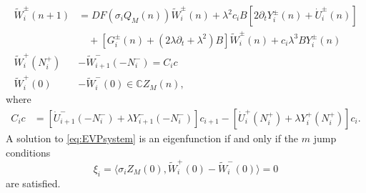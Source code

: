 \documentclass[12pt,reqno]{amsart}
\def\C{{\mathbb C}}
\theoremstyle{definition}
\begin{document}
\begin{equation}\label{eq:EVPsystem}
\begin{aligned}
\tilde{W}_i^\pm(n+1) &= DF(\sigma_i Q_M(n)) \tilde{W}_i^\pm(n) + \lambda^2 c_i B[ 2 \partial_t Y_i^\pm(n) + \dot{U}_i^\pm(n)] \\
&\quad+ [G_i^\pm(n) + (2 \lambda \partial_t + \lambda^2) B] \tilde{W}_i^\pm(n) + c_i \lambda^3 B Y_i^\pm(n) \\
\tilde{W}_i^+(N_i^+) &- \tilde{W}_{i+1}^-(-N_i^-) = C_i c \\
\tilde{W}_i^+(0) &- \tilde{W}_i^-(0) \in \C Z_M(n),
\end{aligned}
\end{equation}
where
\begin{equation}
\begin{aligned}
C_i c &= [ \dot{U}_{i+1}^-(-N_i^-) + \lambda Y_{i+1}^-(-N_i^-) ]c_{i+1} 
- [ \dot{U}_i^+(N_i^+) + \lambda Y_i^+(N_i^+) ] c_i.
\end{aligned}
\end{equation}
A solution to \cref{eq:EVPsystem} is an eigenfunction if and only if the $m$ jump conditions
\begin{equation}\label{eq:jump1}
\xi_i = \langle \sigma_i Z_M(0), \tilde{W}_i^+(0) - \tilde{W}_i^-(0) \rangle = 0
\end{equation}
are satisfied.
\end{document}
